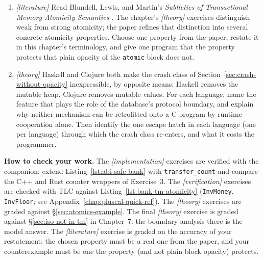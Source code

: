 \begin{enumerate}
\item \emph{[literature]} Read Blundell, Lewis, and Martin's
\emph{Subtleties of Transactional Memory Atomicity Semantics}
\cite{blundell06subtleties}.  The chapter's \emph{[theory]} exercises
distinguish weak from strong atomicity; the paper refines that
distinction into several concrete atomicity properties.  Choose one
property from the paper, restate it in this chapter's terminology, and
give one program that the property protects that plain opacity of the
\texttt{atomic} block does not.

\item \emph{[theory]} Haskell and Clojure both make the crash class of
Section~\ref{sec:crash-without-opacity} inexpressible, by opposite means:
Haskell removes the mutable heap, Clojure removes mutable values. For each
language, name the feature that plays the role of the database's protocol
boundary, and explain why neither mechanism can be retrofitted onto a C
program by runtime cooperation alone. Then identify the one escape hatch in
each language (one per language) through which the crash class re-enters, and
what it costs the programmer.
\end{enumerate}

\textbf{How to check your work.} The \emph{[implementation]} exercises are
verified with the companion: extend Listing~\ref{lst:abi-safe-bank} with
\texttt{transfer\_count} and compare the C++ and Rust counter wrappers of
Exercise~3.  The \emph{[verification]} exercises are checked with TLC against
Listing~\ref{lst:bank-tm-atomicity} (\texttt{InvMoney}, \texttt{InvFloor}; see
Appendix~\ref{chap:pluscal-quick-ref}).  The \emph{[theory]} exercises are
graded against \S\ref{sec:atomics-example}.  The final \emph{[theory]}
exercise is graded against \S\ref{sec:iso-not-in-tm} in Chapter~7: the boundary analysis
there is the model answer.  The \emph{[literature]}
exercise is graded on the accuracy of your restatement: the chosen
property must be a real one from the paper, and your counterexample must
be one the property (and not plain block opacity) protects.

